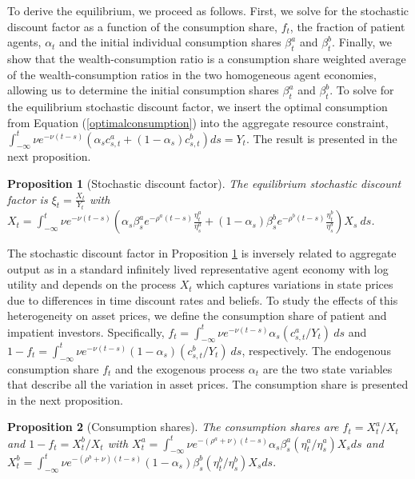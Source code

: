 \documentclass[preprint,11pt,authoryear]{elsarticle}
\theoremstyle{plain}
\newtheorem{prop}{Proposition}
\begin{document}
To derive the equilibrium, we proceed as follows. First, we solve for the stochastic discount factor as a function of the consumption share, $f_t$, the fraction of patient agents, $\alpha_t$ and the initial individual consumption shares $\beta^a_{t}$ and $\beta^b_{t}$. Finally, we show that the wealth-consumption ratio is a consumption share weighted average of the wealth-consumption ratios in the two homogeneous agent economies, allowing us to determine the initial consumption shares $\beta^a_{t}$ and $\beta^b_{t}$.  To solve for the  equilibrium stochastic discount factor, we insert the optimal consumption from Equation (\ref{optimalconsumption}) into the aggregate resource constraint, $\int_{-\infty}^{t} \nu e^{-\nu (t-s )} (\alpha_s c^a_{s,t}+(1-\alpha_s) c^b_{s,t}) ds =  Y_t$. The result is presented in the next proposition.
\begin{prop}[Stochastic discount factor]\label{SDF}
The equilibrium stochastic discount factor is $\xi_t = \frac{X_t}{Y_t}$ with $X_t =\int_{-\infty}^{t} \nu e^{-\nu \left(t-s\right)} \left(\alpha_s \beta^a_s e^{-\rho^a \left(t-s\right)}\frac{\eta^a_t}{\eta^a_s} +\left(1-\alpha_s\right)\beta^b_s e^{-\rho^b \left(t-s\right)} \frac{\eta^b_t}{\eta^b_s}\right)X_s \: ds$.
\end{prop}
The stochastic discount factor in Proposition \ref{SDF} is inversely related to aggregate output as in a standard infinitely lived representative agent economy with log utility and depends on the process $X_t$ which captures variations in state prices due to differences in time discount rates and beliefs. To study the effects of this heterogeneity on asset prices, we define the consumption share of patient and impatient investors. Specifically, $f_t  = \int_{-\infty}^t \nu  e^{-\nu(t-s)}  \alpha_s (c_{s,t}^a/Y_t) \: ds$ and $1-f_t  = \int_{-\infty}^t \nu  e^{-\nu(t-s)}  (1-\alpha_s) (c_{s,t}^b/ Y_t) \: ds$, respectively.  
The endogenous consumption share $f_t$ and the exogenous process $\alpha_t$ are the two state variables that describe all the variation in asset prices.  The consumption share is presented in the next proposition. 
%
\begin{prop}[Consumption shares]\label{prop:f}
The consumption shares are $f_t = X^a_t/X_t$ and $1-f_t = X^b_t/X_t$ with $X^a_t = \int_{-\infty}^{t} \nu e^{-\left(\rho^a + \nu\right)\left(t-s\right)}\alpha_s \beta^a_s (\eta^a_t/\eta^a_s)X_s ds$ and $X^b_t = \int_{-\infty}^{t} \nu e^{-\left(\rho^b + \nu\right)\left(t-s\right)}\left(1-\alpha_s\right) \beta^b_s (\eta^b_t/\eta^b_s)X_s ds.$
\end{prop}
\end{document}
